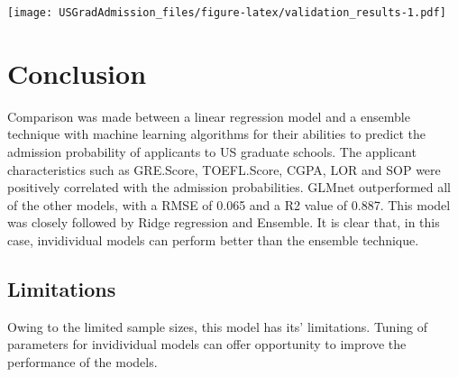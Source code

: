 \documentclass[11pt,]{article}
\begin{document}
\texttt{[image: USGradAdmission\_files/figure-latex/validation\_results-1.pdf]}

\hypertarget{conclusion}{%
\section{Conclusion}\label{conclusion}}

Comparison was made between a linear regression model and a ensemble
technique with machine learning algorithms for their abilities to
predict the admission probability of applicants to US graduate schools.
The applicant characteristics such as GRE.Score, TOEFL.Score, CGPA, LOR
and SOP were positively correlated with the admission probabilities.
GLMnet outperformed all of the other models, with a RMSE of 0.065 and a
R2 value of 0.887. This model was closely followed by Ridge regression
and Ensemble. It is clear that, in this case, invidividual models can
perform better than the ensemble technique.

\hypertarget{limitations}{%
\subsection{Limitations}\label{limitations}}

Owing to the limited sample sizes, this model has its' limitations.
Tuning of parameters for invidividual models can offer opportunity to
improve the performance of the models.





\newpage
\singlespacing 
\end{document}

